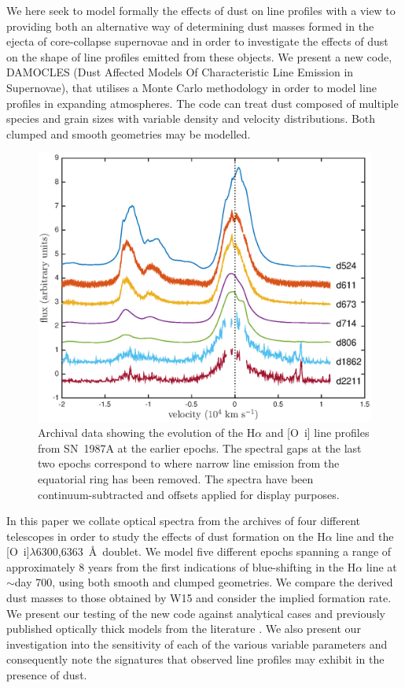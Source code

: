 \documentclass[useAMS,usenatbib,usegraphicx]{mnras}
\begin{document}
We here seek to model formally the effects of dust on line profiles with a 
view to providing both an alternative way of determining dust 
masses formed in the ejecta of core-collapse supernovae and in order to investigate 
the  effects of dust on the shape of line profiles emitted from 
these objects.  We present a new code, DAMOCLES (Dust Affected Models Of 
Characteristic Line Emission in Supernovae), that utilises a Monte Carlo 
methodology in order to  model line profiles in expanding 
atmospheres.  The code can treat dust composed of multiple species 
and grain sizes with variable density and velocity distributions.  Both 
clumped and smooth geometries may be modelled.

\begin{figure}
\includegraphics[trim =39 10 45 15,clip=true,scale=0.51]{Ha_evol_early_1col}
\caption{Archival data showing the evolution of the H$\alpha$ and
[O~{\sc i}] line profiles from SN~1987A at the earlier epochs. The 
spectral gaps at the last two epochs correspond to where narrow line 
emission from the equatorial ring has been removed. The spectra have been
continuum-subtracted and offsets applied for display purposes.}
\label{Ha_evol_early}
\end{figure}

In this paper we collate optical spectra from the archives of four 
different telescopes in order to study the effects of dust formation on 
the H$\alpha$ line and the [O~{\sc i}]$\lambda$6300,6363~\AA\ doublet.  
We model five different epochs spanning a range of approximately 8 years 
from the first indications of blue-shifting in the H$\alpha$ line at 
$\sim$day 700, using both smooth and clumped geometries.  We compare the 
derived dust masses to those obtained by W15 and consider the implied 
formation rate.  We present our testing of the new code against 
analytical cases and previously published optically thick models from 
the literature \citep{Lucy1989}. We also present our investigation into 
the sensitivity of each of the various variable parameters and 
consequently note the signatures that observed line profiles may exhibit 
in the presence of dust.
\end{document}
